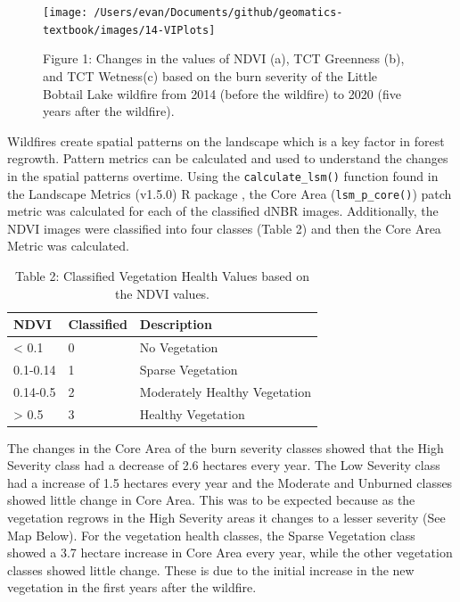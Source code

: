 \documentclass[
]{book}
\begin{document}
\begin{figure}
\texttt{[image: /Users/evan/Documents/github/geomatics-textbook/images/14-VIPlots]} \caption{Figure 1: Changes in the values of NDVI (a), TCT Greenness (b), and TCT Wetness(c) based on the burn severity of the Little Bobtail Lake wildfire from 2014 (before the wildfire) to 2020 (five years after the wildfire).}\label{fig:unnamed-chunk-12}
\end{figure}

Wildfires create spatial patterns on the landscape which is a key factor in forest regrowth. Pattern metrics can be calculated and used to understand the changes in the spatial patterns overtime. Using the \texttt{calculate\_lsm()} function found in the Landscape Metrics (v1.5.0) R package \citep{hesselbarth_landscapemetrics_2019}, the Core Area (\texttt{lsm\_p\_core()}) patch metric was calculated for each of the classified dNBR images. Additionally, the NDVI images were classified into four classes (Table 2) and then the Core Area Metric was calculated.

\begin{table}

\caption{\label{tab:unnamed-chunk-13}Table 2: Classified Vegetation Health Values based on the NDVI values.}
\centering
\begin{tabular}[t]{l|l|l}
\hline
NDVI & Classified & Description\\
\hline
< 0.1 & 0 & No Vegetation\\
\hline
0.1-0.14 & 1 & Sparse Vegetation\\
\hline
0.14-0.5 & 2 & Moderately Healthy Vegetation\\
\hline
> 0.5 & 3 & Healthy Vegetation\\
\hline
\end{tabular}
\end{table}

The changes in the Core Area of the burn severity classes showed that the High Severity class had a decrease of 2.6 hectares every year. The Low Severity class had a increase of 1.5 hectares every year and the Moderate and Unburned classes showed little change in Core Area. This was to be expected because as the vegetation regrows in the High Severity areas it changes to a lesser severity (See Map Below). For the vegetation health classes, the Sparse Vegetation class showed a 3.7 hectare increase in Core Area every year, while the other vegetation classes showed little change. These is due to the initial increase in the new vegetation in the first years after the wildfire.
\end{document}
